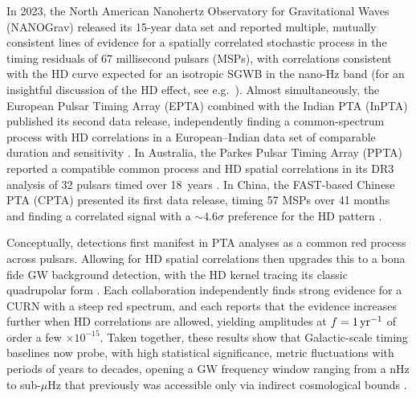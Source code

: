\documentclass[a4paper,11pt]{article}
\begin{document}
In 2023, the North American Nanohertz Observatory for Gravitational Waves (NANOGrav) released its 15-year data set \citep{McLaughlin:2013ira} and reported multiple, 
mutually consistent lines of evidence for a spatially correlated stochastic process 
in the timing residuals of 67 millisecond pulsars (MSPs), with correlations consistent with 
the HD curve \citep{HellingsDowns:1983} expected for an isotropic SGWB 
in the nano-Hz band \citep{Agazie:2023ome,NANOGrav:2023hvm} (for an insightful discussion 
of the HD effect, see e.g.~\citep{Jenet:2014bea}). Almost simultaneously, the European Pulsar 
Timing Array (EPTA) combined with the Indian PTA (InPTA) published its second data release,
independently finding a common-spectrum process with HD correlations in a European–Indian 
data set of comparable duration and sensitivity \citep{Antoniadis:2023xep,Antoniadis:2023xlr}. 
In Australia, the Parkes Pulsar Timing Array (PPTA) reported a compatible common process 
and HD spatial correlations in its DR3 analysis of 32 pulsars timed over 18~years
\citep{Reardon:2023gzh,Zic:2023ppta}. In China, the FAST-based Chinese PTA (CPTA) presented 
its first data release, timing 57 MSPs over 41 months and finding a correlated signal with 
a $\sim 4.6\sigma$ preference for the HD pattern \citep{Xu:2023wog}. 

Conceptually, detections first manifest in PTA analyses as a common red process 
across pulsars. Allowing for HD spatial correlations then upgrades this to 
a bona fide GW background detection, with the HD kernel tracing its classic 
quadrupolar form \citep{HellingsDowns:1983}. Each collaboration independently 
finds strong evidence for a CURN with a steep red spectrum, and each reports 
that the evidence increases further when HD correlations are allowed, yielding 
amplitudes at $f=1\,{\rm yr}^{-1}$ of order a few $\times 10^{-15}$. Taken together, 
these results show that Galactic-scale timing baselines now probe, with high 
statistical significance, metric fluctuations with periods of years to decades, 
opening a GW frequency window ranging from a nHz to sub-$\mu$Hz that previously 
was accessible only via indirect cosmological 
bounds \citep{BurkeSpolaor:2019CQG,Taylor:2025SKAReview}.
\end{document}

